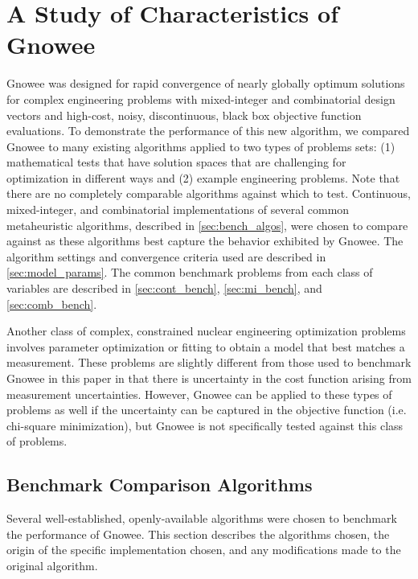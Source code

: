 \documentclass{article}                                                                           %
\begin{document}
\section{A Study of Characteristics of Gnowee} \label{sec:set-up}
Gnowee was designed for rapid convergence of nearly globally optimum solutions for complex engineering problems with mixed-integer and combinatorial design vectors and high-cost, noisy, discontinuous, black box objective function evaluations. 
To demonstrate the performance of this new algorithm, we compared Gnowee to many existing algorithms applied to two types of problems sets: (1) mathematical tests that have solution spaces that are challenging for optimization in different ways and (2) example engineering problems. 
Note that there are no completely comparable algorithms against which to test.
Continuous, mixed-integer, and combinatorial implementations of several common metaheuristic algorithms, described in \autoref{sec:bench_algos}, were chosen to compare against as these algorithms best capture the behavior exhibited by Gnowee.
The algorithm settings and convergence criteria used are described in \autoref{sec:model_params}.
The common benchmark problems from each class of variables are described in \autoref{sec:cont_bench}, \autoref{sec:mi_bench}, and \autoref{sec:comb_bench}.

Another class of complex, constrained nuclear engineering optimization problems involves parameter optimization or fitting to obtain a model that best matches a measurement.
These problems are slightly different from those used to benchmark Gnowee in this paper  in that there is uncertainty in the cost function arising from measurement uncertainties. 
However, Gnowee can be applied to these types of problems as well if the uncertainty can be captured in the objective function (i.e. chi-square minimization), but Gnowee is not specifically tested against this class of problems.

\subsection{Benchmark Comparison Algorithms} \label{sec:bench_algos}
Several well-established, openly-available algorithms were chosen to benchmark the performance of Gnowee.  
This section describes the algorithms chosen, the origin of the specific implementation chosen, and any modifications made to the original algorithm.  
\end{document}
